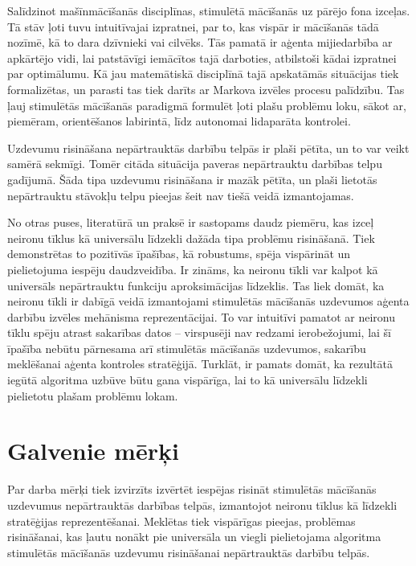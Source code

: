 \documentclass[a0,landscape]{a0poster}
\begin{document}
\begin{multicols}{4}
Salīdzinot mašīnmācīšanās disciplīnas, stimulētā mācīšanās uz pārējo fona izceļas.
Tā stāv ļoti tuvu intuitīvajai izpratnei, par to, kas vispār ir mācīšanās tādā nozīmē, kā to dara dzīvnieki vai cilvēks.
Tās pamatā ir aģenta mijiedarbība ar apkārtējo vidi, lai patstāvīgi iemācītos tajā darboties, atbilstoši kādai izpratnei par optimālumu.
Kā jau matemātiskā disciplīnā tajā apskatāmās situācijas tiek formalizētas, un parasti tas tiek darīts ar Markova izvēles procesu palīdzību.
Tas ļauj stimulētās mācīšanās paradigmā formulēt ļoti plašu problēmu loku, sākot ar, piemēram, orientēšanos labirintā, līdz autonomai lidaparāta kontrolei.

Uzdevumu risināšana nepārtrauktās darbību telpās ir plaši pētīta, un to var veikt samērā sekmīgi.
Tomēr citāda situācija paveras nepārtrauktu darbības telpu gadījumā.
Šāda tipa uzdevumu risināšana ir mazāk pētīta, un plaši lietotās nepārtrauktu stāvokļu telpu pieejas šeit nav tiešā veidā izmantojamas.

No otras puses, literatūrā un praksē ir sastopams daudz piemēru, kas izceļ neironu tīklus kā universālu līdzekli dažāda tipa problēmu risināšanā.
Tiek demonstrētas to pozitīvās īpašības, kā robustums, spēja vispārināt un pielietojuma iespēju daudzveidība.
Ir zināms, ka neironu tīkli var kalpot kā universāls nepārtrauktu funkciju aproksimācijas līdzeklis.
Tas liek domāt, ka neironu tīkli ir dabīgā veidā izmantojami stimulētās mācīšanās uzdevumos aģenta darbību izvēles mehānisma reprezentācijai.
To var intuitīvi pamatot ar neironu tīklu spēju atrast sakarības datos -- virspusēji nav redzami ierobežojumi, lai šī īpašība nebūtu pārnesama arī stimulētās mācīšanās uzdevumos, sakarību meklēšanai aģenta kontroles stratēģijā.
Turklāt, ir pamats domāt, ka rezultātā iegūtā algoritma uzbūve būtu gana vispārīga, lai to kā universālu līdzekli pielietotu plašam problēmu lokam.


\color{DarkSlateGray} %

\section*{Galvenie mērķi}

Par darba mērķi tiek izvirzīts izvērtēt iespējas risināt stimulētās mācīšanās uzdevumus nepārtrauktās darbības telpās, izmantojot neironu tīklus kā līdzekli stratēģijas reprezentēšanai.
Meklētas tiek vispārīgas pieejas, problēmas risināšanai, kas ļautu nonākt pie universāla un viegli pielietojama algoritma stimulētās mācīšanās uzdevumu risināšanai nepārtrauktās darbību telpās.


\end{multicols}
\end{document}
